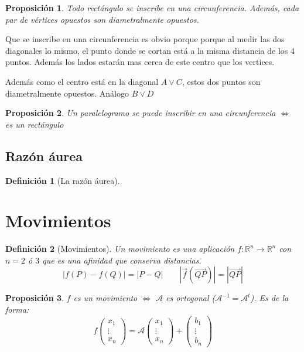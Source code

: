 \documentclass[11pt, a4paper]{article}
\makeatletter
\newif\IfInSansMode
\let\oldsf\sffamily
\renewcommand*{\sffamily}{\oldsf\mathversion{sans}\InSansModetrue}
\let\oldnorm\normalfont
\renewcommand*{\normalfont}{\oldnorm\InSansModefalse\mathversion{normal}}
\renewenvironment{proof}[1][\proofname] {\vspace{-15pt}\par\pushQED{\qed}\normalfont\topsep6\p@\@plus6\p@\relax\trivlist\item[\hskip\labelsep\it#1\@addpunct{.}]\ignorespaces}{\popQED\endtrivlist\@endpefalse}
\newcommand{\R}{\mathbb{R}}
\renewcommand{\vec}{\overrightarrow}
\renewenvironment{proof}[1][\proofname] {\par\pushQED{\qed}\normalfont\topsep6\p@\@plus6\p@\relax\trivlist\item[\hskip\labelsep\itshape\sffamily#1\@addpunct{.}]\ignorespaces}{\popQED\endtrivlist\@endpefalse}
\theoremstyle{theorem-style}
\newtheorem{nprop}{Proposición}[section]
\theoremstyle{definition-style}
\newtheorem{ndef}{Definición}[section]
\theoremstyle{remark-style}
\theoremstyle{example-style}
\makeatother
\begin{document}
\begin{nprop}
  Todo rectángulo se inscribe en una circunferencia. Además, cada par de vértices opuestos son diametralmente opuestos.
\end{nprop}

\begin{proof}
	Que se inscribe en una circunferencia es obvio porque porque al medir las dos diagonales lo mismo, el punto donde se cortan está a la misma distancia de los 4 puntos. Además los lados estarán mas cerca de este centro que los vertices. 
	
	Además como el centro está en la diagonal $A\vee C$, estos dos puntos son diametralmente opuestos. Análogo $B\vee D$
\end{proof}

\begin{nprop}
  Un paralelogramo se puede inscribir en una circunferencia $\iff$ es un rectángulo
\end{nprop}

\subsection {Razón áurea}
\begin{ndef}[La razón áurea]
  
\end{ndef}

\section{Movimientos}

\begin{ndef}[Movimientos]
  Un movimiento es una aplicación $f:\R^n \to \R^n$ con $n= 2$ ó $3$ que es una afinidad que conserva distancias.
  \[
    |f(P)-f(Q)|= |P-Q| \quad  \quad |\vec{f}(\vec{QP})|= |\vec{QP}|
  \]
\end{ndef}

\begin{nprop}
  $f$ es un movimiento $\iff$ $\mathcal A$ es ortogonal ($\mathcal A ^{-1}= \mathcal A ^t$). Es de la forma:
  \[
    f \begin{pmatrix}
      x_1\\
      \vdots\\
      x_n 
    \end{pmatrix} = \mathcal A \begin{pmatrix}
      x_1\\
      \vdots\\
      x_n 
    \end{pmatrix} + \begin{pmatrix}
      b_1\\
      \vdots\\
      b_n 
    \end{pmatrix}
  \]
\end{nprop}
\end{document}

